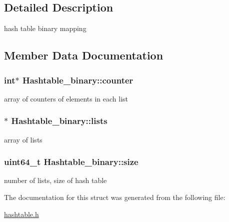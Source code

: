 \subsection{Detailed Description}
hash table binary mapping 

\subsection{Member Data Documentation}
\subsubsection[{\texorpdfstring{counter}{counter}}]{\setlength{\rightskip}{0pt plus 5cm}int$\ast$ Hashtable\+\_\+binary\+::counter}\hypertarget{structHashtable__binary_a84f8baf046a4f7a75a405e8fd448bac8}{}\label{structHashtable__binary_a84f8baf046a4f7a75a405e8fd448bac8}
array of counters of elements in each list 
\subsubsection[{\texorpdfstring{lists}{lists}}]{$\ast$ Hashtable\+\_\+binary\+::lists}\hypertarget{structHashtable__binary_a6c33200915e4022c6c561f35fc36d4e0}{}\label{structHashtable__binary_a6c33200915e4022c6c561f35fc36d4e0}
array of lists 
\subsubsection[{\texorpdfstring{size}{size}}]{\setlength{\rightskip}{0pt plus 5cm}uint64\+\_\+t Hashtable\+\_\+binary\+::size}\hypertarget{structHashtable__binary_a2232ebf98285e8d0154badb1db51fdc5}{}\label{structHashtable__binary_a2232ebf98285e8d0154badb1db51fdc5}
number of lists, size of hash table 

The documentation for this struct was generated from the following file\+:\begin{DoxyCompactItemize}
\item 
\hyperlink{hashtable_8h}{hashtable.\+h}\end{DoxyCompactItemize}
